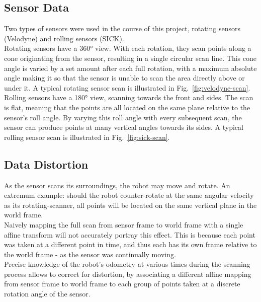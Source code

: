 \subsection{Sensor Data}
\label{subsec:sensordata}

Two types of sensors were used in the course of this project, rotating sensors (Velodyne) and rolling sensors (SICK). \\

Rotating sensors have a 360° view. With each rotation, they scan points along a cone originating from the sensor, resulting in a single circular scan line. This cone angle is varied by a set amount after each full rotation, with a maximum absolute angle making it so that the sensor is unable to scan the area directly above or under it. A typical rotating sensor scan is illustrated in Fig.~\ref{fig:velodyne-scan}.\\ %

Rolling sensors have a 180° view, scanning towards the front and sides. The scan is flat, meaning that the points are all located on the same plane relative to the sensor’s roll angle. By varying this roll angle with every subsequent scan, the sensor can produce points at many vertical angles towards its sides. A typical rolling sensor scan is illustrated in Fig.~\ref{fig:sick-scan}.\\ %

\subsection{Data Distortion}
\label{subsec:distortion}

As the sensor scans its surroundings, the robot may move and rotate. An extremum example: should the robot counter-rotate at the same angular velocity as its rotating-scanner, all points will be located on the same vertical plane in the world frame.\\

Naively mapping the full scan from sensor frame to world frame with a single affine transform will not accurately portray this effect. This is because each point was taken at a different point in time, and thus each has its own frame relative to the world frame - as the sensor was continually moving.\\

Precise knowledge of the robot’s odometry at various times during the scanning process allows to correct for distortion, by associating a different affine mapping from sensor frame to world frame to each group of points taken at a discrete rotation angle of the sensor.\\

